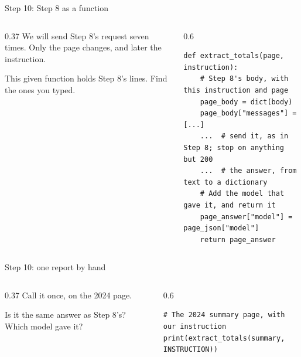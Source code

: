 \documentclass[9pt,aspectratio=169]{beamer}
\begin{document}
\begin{frame}[fragile]{Step 10: Step 8 as a function}
    \begin{columns}[T]
        \begin{column}{0.37\textwidth}
            We will send Step 8's request seven times. Only the page changes, and later the instruction.

            \medskip
            This given function holds Step 8's lines. Find the ones you typed.
        \end{column}
        \begin{column}{0.6\textwidth}
\begin{lstlisting}
def extract_totals(page, instruction):
    # Step 8's body, with this instruction and page
    page_body = dict(body)
    page_body["messages"] = [...]
    ...  # send it, as in Step 8; stop on anything but 200
    ...  # the answer, from text to a dictionary
    # Add the model that gave it, and return it
    page_answer["model"] = page_json["model"]
    return page_answer
\end{lstlisting}
        \end{column}
    \end{columns}
\end{frame}

\begin{frame}[fragile]{Step 10: one report by hand}
    \begin{columns}[T]
        \begin{column}{0.37\textwidth}
            Call it once, on the 2024 page.

            \medskip
            Is it the same answer as Step 8's? Which model gave it?
        \end{column}
        \begin{column}{0.6\textwidth}
\begin{lstlisting}
# The 2024 summary page, with our instruction
print(extract_totals(summary, INSTRUCTION))
\end{lstlisting}
        \end{column}
    \end{columns}
\end{frame}
\end{document}

